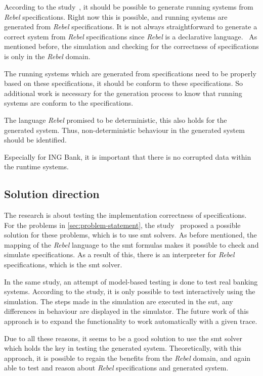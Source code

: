 According to the study~\cite[p.~3]{stoel2015case}, it should be possible to generate
running systems from \textit{Rebel} specifications. Right now this is possible, and
running systems are generated from \textit{Rebel} specifications. It is not always straightforward to generate a correct system from \textit{Rebel}
specifications since \textit{Rebel} is a declarative language.~\cite[p.~3]{stoel2015case}
As mentioned before, the simulation and checking for the correctness of
specifications is only in the \textit{Rebel} domain.

The running systems which are
generated from specifications need to be properly based on these specifications,
it should be conform to these specifications. So additional work is necessary for
the generation process to know that running systems are conform to the
specifications.

The language \textit{Rebel} promised to be deterministic, this also holds
for the generated system. Thus, non-deterministic behaviour in the generated
system should be identified.

Especially for ING Bank, it is important that there is no corrupted data within
the runtime systems.

\subsection{Solution direction}\label{sec:solution-direction}

The research is about testing the implementation correctness of specifications.
For the problems in \autoref{sec:problem-statement}, the
study~\cite[p.3]{stoel2015case} proposed a possible solution for these problems,
which is to use \gls{smt} solvers. As before mentioned, the mapping of the \textit{Rebel}
language to the \gls{smt} formulas makes it possible to check and simulate
specifications. As a result of this, there is an interpreter for \textit{Rebel}
specifications, which is the \gls{smt}
solver.~\cite[p.5]{stoel_storm_vinju_bosman_2016}

In the same study,
an attempt of model-based testing is done to test real banking systems.
According to the study, it is only possible to test interactively using the
simulation. The steps made in the simulation are executed in the \gls{sut}, any
differences in behaviour are displayed in the simulator. The future work of this
approach is to expand the functionality to work automatically with a given
trace.

Due to all these reasons, it seems to be a good solution to use the \gls{smt}
solver which holds the key in testing the generated system. Theoretically, with
this approach, it is possible to regain the benefits from the \textit{Rebel} domain, and
again able to test and reason about \textit{Rebel} specifications and generated system.

